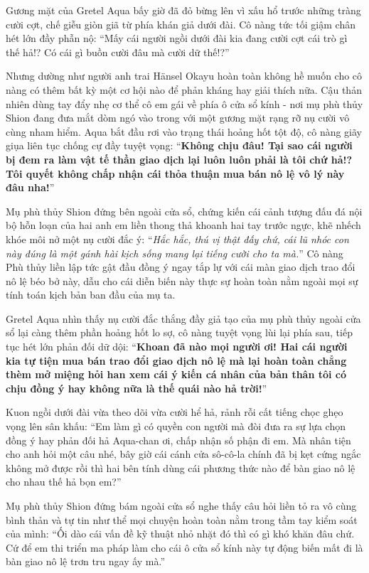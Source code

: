 \documentclass[../main.tex]{subfiles}
\begin{document}
Gương mặt của Gretel Aqua bấy giờ đã đỏ bừng lên vì xấu hổ trước những tràng cười cợt, chế giễu giòn giã từ phía khán giả dưới đài. Cô nàng tức tối giậm chân hét lớn đầy phẫn nộ: ``Mấy cái người ngồi dưới đài kia đang cười cợt cái trò gì thế hả!? Có cái gì buồn cười đâu mà cười dữ thế!?''

Nhưng dường như người anh trai Hänsel Okayu hoàn toàn không hề muốn cho cô nàng có thêm bất kỳ một cơ hội nào để phản kháng hay giải thích nữa. Cậu thản nhiên dùng tay đẩy nhẹ cơ thể cô em gái về phía ô cửa sổ kính - nơi mụ phù thủy Shion đang đưa mắt dòm ngó vào trong với một gương mặt rạng rỡ nụ cười vô cùng nham hiểm. Aqua bắt đầu rơi vào trạng thái hoảng hốt tột độ, cô nàng giãy giụa liên tục chống cự đầy tuyệt vọng: ``\textbf{Không chịu đâu! Tại sao cái người bị đem ra làm vật tế thần giao dịch lại luôn luôn phải là tôi chứ hả!? Tôi quyết không chấp nhận cái thỏa thuận mua bán nô lệ vô lý này đâu nha!}''

Mụ phù thủy Shion đứng bên ngoài cửa sổ, chứng kiến cái cảnh tượng đấu đá nội bộ hỗn loạn của hai anh em liền thong thả khoanh hai tay trước ngực, khẽ nhếch khóe môi nở một nụ cười đắc ý: ``\textit{Hắc hắc, thú vị thật đấy chứ, cái lũ nhóc con này đúng là một gánh hài kịch sống mang lại tiếng cười cho ta mà.}'' Cô nàng Phù thủy liền lập tức gật đầu đồng ý ngay tắp lự với cái màn giao dịch trao đổi nô lệ béo bở này, dẫu cho cái diễn biến này thực sự hoàn toàn nằm ngoài mọi sự tính toán kịch bản ban đầu của mụ ta.

Gretel Aqua nhìn thấy nụ cười đắc thắng đầy giả tạo của mụ phù thủy ngoài cửa sổ lại càng thêm phần hoảng hốt lo sợ, cô nàng tuyệt vọng lùi lại phía sau, tiếp tục hét lớn phản đối dữ dội: ``\textbf{Khoan đã nào mọi người ơi! Hai cái người kia tự tiện mua bán trao đổi giao dịch nô lệ mà lại hoàn toàn chẳng thèm mở miệng hỏi han xem cái ý kiến cá nhân của bản thân tôi có chịu đồng ý hay không nữa là thế quái nào hả trời!}''

\il

Kuon ngồi dưới đài vừa theo dõi vừa cười hể hả, rảnh rỗi cất tiếng chọc ghẹo vọng lên sân khấu: ``Em làm gì có quyền con người mà đòi đưa ra sự lựa chọn đồng ý hay phản đối hả Aqua-chan ơi, chấp nhận số phận đi em. Mà nhân tiện cho anh hỏi một câu nhé, bây giờ cái cánh cửa sô-cô-la chính đã bị kẹt cứng ngắc không mở được rồi thì hai bên tính dùng cái phương thức nào để bàn giao nô lệ cho nhau thế hả bọn em?''

\il

Mụ phù thủy Shion đứng bám ngoài cửa sổ nghe thấy câu hỏi liền tỏ ra vô cùng bình thản và tự tin như thể mọi chuyện hoàn toàn nằm trong tầm tay kiểm soát của mình: ``Ối dào cái vấn đề kỹ thuật nhỏ nhặt đó thì có gì khó khăn đâu chứ. Cứ để em thi triển ma pháp làm cho cái ô cửa sổ kính này tự động biến mất đi là bàn giao nô lệ trơn tru ngay ấy mà.''
\end{document}
